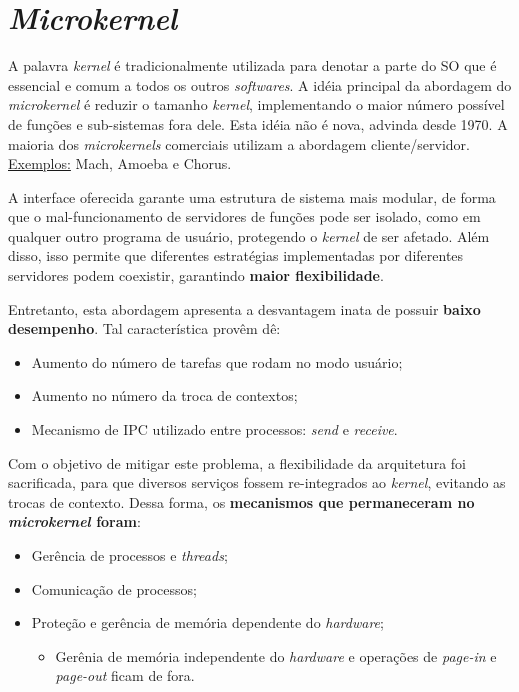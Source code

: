 \chapter{\textit{Microkernel}}
A palavra \textit{kernel} é tradicionalmente utilizada para denotar a parte do SO que é essencial e comum a todos os outros \textit{softwares}. A idéia principal da abordagem do \textit{microkernel} é reduzir o tamanho \textit{kernel}, implementando o maior número possível de funções e sub-sistemas fora dele. Esta idéia não é nova, advinda desde 1970. A maioria dos \textit{microkernels} comerciais utilizam a abordagem cliente/servidor. \underline{Exemplos:} Mach, Amoeba e Chorus.

A interface oferecida garante uma estrutura de sistema mais modular, de forma que o mal-funcionamento de servidores de funções pode ser isolado, como em qualquer outro programa de usuário, protegendo o \textit{kernel} de ser afetado. Além disso, isso permite que diferentes estratégias implementadas por diferentes servidores podem coexistir, garantindo \textbf{maior flexibilidade}.

Entretanto, esta abordagem apresenta a desvantagem inata de possuir \textbf{baixo desempenho}. Tal característica provêm dê:
\begin{itemize}
  \item Aumento do número de tarefas que rodam no modo usuário;
  \item Aumento no número da troca de contextos;
  \item Mecanismo de IPC utilizado entre processos: \textit{send} e \textit{receive}.
\end{itemize}

Com o objetivo de mitigar este problema, a flexibilidade da arquitetura foi sacrificada, para que diversos serviços fossem re-integrados ao \textit{kernel}, evitando as trocas de contexto. Dessa forma, os \textbf{mecanismos que permaneceram no \textit{microkernel} foram}:
\begin{itemize}
  \item Gerência de processos e \textit{threads};
  \item Comunicação de processos;
  \item Proteção e gerência de memória dependente do \textit{hardware};
  \begin{itemize}
    \item Gerênia de memória independente do \textit{hardware} e operações de \textit{page-in} e \textit{page-out} ficam de fora.
  \end{itemize}
\end{itemize}


